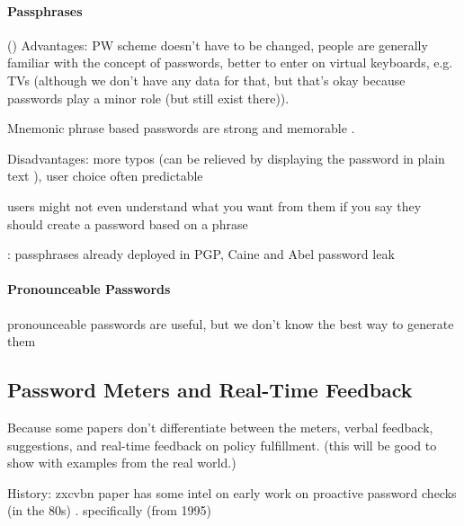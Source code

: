 	\paragraph{Passphrases}\label{sec:rw:passphrases}
	()
	Advantages: PW scheme doesn't have to be changed, people are generally familiar with the concept of passwords, better to enter on virtual keyboards, e.g. TVs (although we don't have any data for that, but that's okay because passwords play a minor role (but still exist there)).
	
	Mnemonic phrase based passwords are strong and memorable \cite{Yan2004PasswordMemorabilitySecurity}.
	
	\cite{Keith2009PassphraseDesign}
	
	Disadvantages: more typos (can be relieved by displaying the password in plain text  \cite{Melicher2016UsabilityMobileTextPasswords}), user choice often predictable
	
	users might not even understand what you want from them if you say they should create a password based on a phrase \cite{Forget2007HelpingUsers}
	
	\cite{Bonneau2012LinguisticProperties}: passphrases already deployed in PGP, Caine and Abel password leak \cite{Carnavalet2014AnalyzingPWStrengthMeters} 
	
	\cite{Shay2012CorrectHorseBatteryStaple}
	
	
	\paragraph{Pronounceable Passwords}
	pronounceable passwords are useful, but we don't know the best way to generate them \cite{Goldberg2015UnspeakablePasswords}
	
	
	\subsection{Password Meters and Real-Time Feedback}
	
	 Because some papers don't differentiate between the meters, verbal feedback, suggestions, and real-time feedback on policy fulfillment. (this will be good to show with examples from the real world.)
	
	
	
	History: zxcvbn paper has some intel on early work on proactive password checks (in the 80s) \cite{Wheeler2016zxcvbn}. specifically (from 1995) \cite{Bishop1995ProactivePasswordChecking}
	
